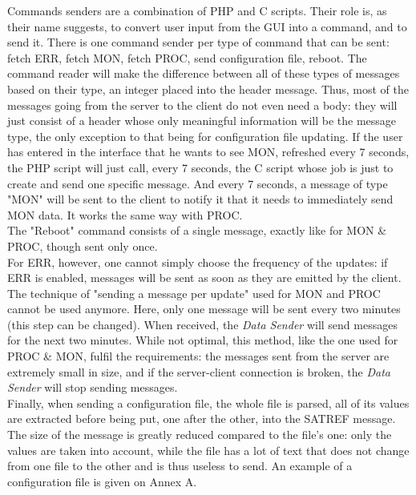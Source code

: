 \documentclass{themeensg}
\begin{document}
Commands senders are a combination of PHP and C scripts. Their role is, as their name suggests, to convert user input from the GUI into a command, and to send it. There is one command sender per type of command that can be sent: fetch ERR, fetch MON, fetch PROC, send configuration file, reboot. The command reader will make the difference between all of these types of messages based on their type, an integer placed into the header message. Thus, most of the messages going from the server to the client do not even need a body: they will just consist of a header whose only meaningful information will be the message type, the only exception to that being for configuration file updating.
If the user has entered in the interface that he wants to see MON, refreshed every 7 seconds, the PHP script will just call, every 7 seconds, the C script whose job is just to create and send one specific message. And every 7 seconds, a message of type "MON" will be sent to the client to notify it that it needs to immediately send MON data. It works the same way with PROC.\\

The "Reboot" command consists of a single message, exactly like for MON \& PROC, though sent only once. \\

For ERR, however, one cannot simply choose the frequency of the updates: if ERR is enabled, messages will be sent as soon as they are emitted by the client. The technique of "sending a message per update" used for MON and PROC cannot be used anymore. Here, only one message will be sent every two minutes (this step can be changed). When received, the \textit{Data Sender} will send messages for the next two minutes. While not optimal, this method, like the one used for PROC \& MON, fulfil the requirements: the messages sent from the server are extremely small in size, and if the server-client connection is broken, the \textit{Data Sender} will stop sending messages.\\

Finally, when sending a configuration file, the whole file is parsed, all of its values are extracted before being put, one after the other, into the SATREF message. The size of the message is greatly reduced compared to the file's one: only the values are taken into account, while the file has a lot of text that does not change from one file to the other and is thus useless to send. An example of a configuration file is given on Annex A.\\
\end{document}
